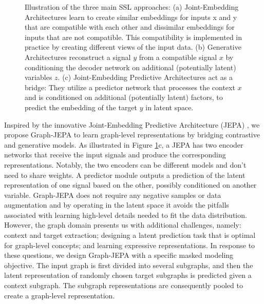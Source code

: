 \documentclass{article} \usepackage{iclr2024_conference,times}
\begin{document}
\begin{figure}
    \centering
    \caption{Illustration of the three main SSL approaches: (a) Joint-Embedding Architectures learn to create similar embeddings for inputs x and y that are compatible with each other and dissimilar embeddings for inputs that are not compatible. This compatibility is implemented in practice by creating different views of the input data. (b) Generative Architectures reconstruct a signal $y$ from a compatible signal $x$ by conditioning the decoder network on additional (potentially latent) variables $z$. (c) Joint-Embedding Predictive Architectures act as a bridge: They utilize a predictor network that processes the context $x$ and is conditioned on additional (potentially latent) factors, to predict the embedding of the target $y$ in latent space.
    }
    \label{fig:jepa-diagram}
\end{figure}

Inspired by the innovative Joint-Embedding Predictive Architecture (JEPA) \citep{lecun2022path,assran2023self}, we propose Graph-JEPA to learn graph-level representations by bridging contrastive and generative models. As illustrated in Figure \ref{fig:jepa-diagram}c, a JEPA has two encoder networks that receive the input signals and produce the corresponding representations. Notably, the two encoders can be different models and don't need to share weights. A predictor module outputs a prediction of the latent representation of one signal based on the other, possibly conditioned on another variable. Graph-JEPA does not require any negative samples or data augmentation and by operating in the latent space it avoids the pitfalls associated with learning high-level details needed to fit the data distribution. However, the graph domain presents us with additional challenges, namely: context and target extraction; designing a latent prediction task that is optimal for graph-level concepts; and learning expressive representations. In response to these questions, we design Graph-JEPA  with a specific masked modeling objective. The input graph is first divided into several subgraphs, and then the latent representation of randomly chosen target subgraphs is predicted given a context subgraph. The subgraph representations are consequently pooled to create a graph-level representation. 
\end{document}
